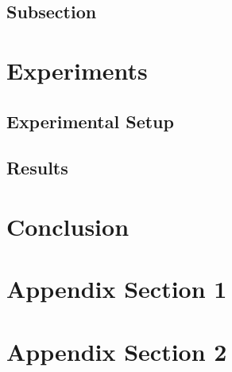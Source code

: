 \documentclass[]{fairmeta} %
\theoremstyle{plain}
\theoremstyle{definition}
\theoremstyle{remark}
\begin{document}
\subsection{Subsection}

\section{Experiments}

\subsection{Experimental Setup}

\subsection{Results}

\section{Conclusion}






\clearpage

\appendix
\tableofcontents
\clearpage
\section{Appendix Section 1}
\section{Appendix Section 2}
\end{document}
